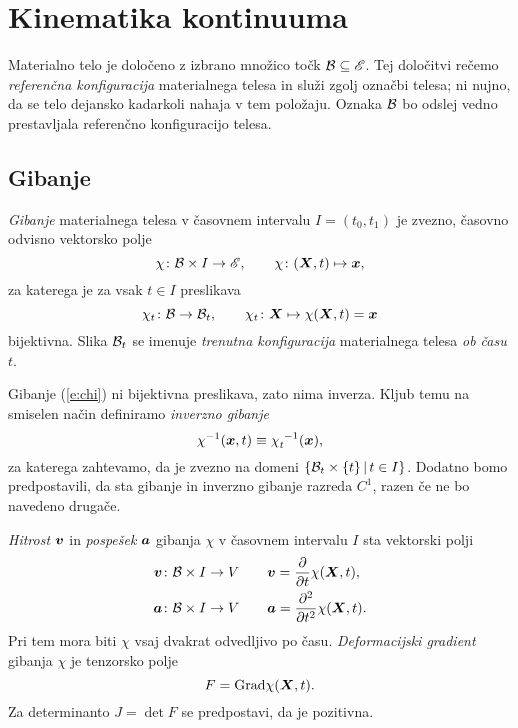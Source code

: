 \chapter{Kinematika kontinuuma}


Materialno telo je določeno z izbrano množico točk $\mathcal B\subseteq\mathscr E$. Tej določitvi rečemo
\emph{referenčna konfiguracija} materialnega telesa in služi zgolj označbi telesa; ni nujno,
da se telo dejansko kadarkoli nahaja v tem položaju. Oznaka $\mathcal B$ bo odslej vedno prestavljala
referenčno konfiguracijo telesa.


\section{Gibanje}


\begin{definicija}
	\emph{Gibanje} materialnega telesa v časovnem
	intervalu $I=(t_0,t_1)$ je zvezno, časovno odvisno vektorsko polje
	\begin{equation}\label{e:chi}
		\chi\colon\mathcal B\times I\to\mathscr E,\qquad \chi\colon (\boldsymbol X,t)\mapsto\boldsymbol x,
	\end{equation}
	za katerega je za vsak $t\in I$ preslikava
	\[ \chi_t\colon\mathcal B\to\mathcal B_t, \qquad \chi_t\colon\boldsymbol X\mapsto\chi(\boldsymbol X,t)=\boldsymbol x \]
	bijektivna. Slika $\mathcal B_t$ se imenuje \emph{trenutna konfiguracija} materialnega
	telesa \emph{ob času} $t$.
\end{definicija}
Gibanje (\ref{e:chi}) ni bijektivna preslikava, zato nima inverza. Kljub temu na smiselen
način definiramo \emph{inverzno gibanje}
\[ \chi^{-1}(\vek{x},t)\equiv\bottop{\chi}{t}{-1}(\vek{x}), \]
za katerega zahtevamo, da je zvezno na domeni $\{\mathcal B_t\times\{t\}\,|\,t\in I\}$.
Dodatno bomo predpostavili, da sta gibanje in inverzno gibanje razreda $C^1$, razen če ne bo navedeno drugače.


\emph{Hitrost} $\boldsymbol v$ in \emph{pospešek} $\boldsymbol a$ gibanja $\chi$ v časovnem intervalu $I$ sta vektorski polji
\begin{align}
	\boldsymbol v\colon\mathcal B\times I\to V \qquad & \boldsymbol v = \frac{\partial}{\partial t}\chi(\boldsymbol X,t), \label{e:v} \\
	\boldsymbol a\colon\mathcal B\times I\to V \qquad & \boldsymbol a = \frac{\partial^2}{\partial t^2}\chi(\boldsymbol X,t). \label{e:a}
\end{align}
Pri tem mora biti $\chi$ vsaj dvakrat odvedljivo po času. \emph{Deformacijski gradient} gibanja $\chi$ je
tenzorsko polje
\begin{equation} \label{e:F} F=\mathrm{Grad}\chi(\boldsymbol X,t). \end{equation}
Za determinanto $J=\det F$ se predpostavi, da je pozitivna.


